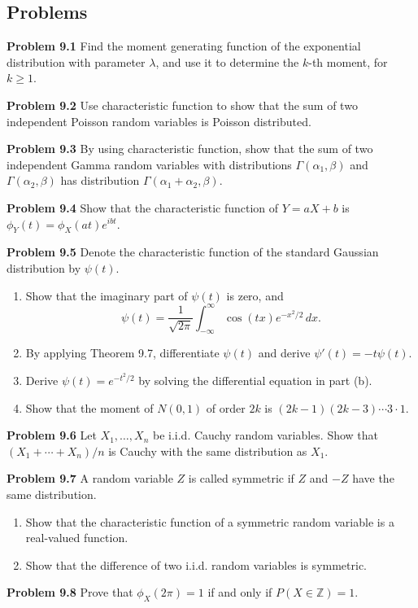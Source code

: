 \subsection*{Problems}

\textbf{Problem 9.1} Find the moment generating function of the exponential distribution with parameter $\lambda$, and use it to determine the $k$-th moment, for $k\geq 1$.

\textbf{Problem 9.2} Use characteristic function to show that the sum of two independent Poisson random variables is Poisson distributed.

\textbf{Problem 9.3} By using characteristic function, show that the sum of two independent Gamma random variables with distributions $\Gamma(\alpha_1,\beta)$ and $\Gamma(\alpha_2,\beta)$ has distribution $\Gamma(\alpha_1+\alpha_2,\beta)$.

\textbf{Problem 9.4} Show that the characteristic function of $Y=aX+b$ is $\phi_Y(t)=\phi_X(at)e^{ibt}$.

\textbf{Problem 9.5} Denote the characteristic function of the standard Gaussian distribution by $\psi(t)$.
\begin{enumerate}
\item Show that the imaginary part of $\psi(t)$ is zero, and
\[
\psi(t)=\frac{1}{\sqrt{2\pi}}\int_{-\infty}^{\infty}\cos(tx)e^{-x^2/2}\,dx.
\]
\item By applying Theorem 9.7, differentiate $\psi(t)$ and derive $\psi'(t)=-t\psi(t)$.
\item Derive $\psi(t)=e^{-t^2/2}$ by solving the differential equation in part (b).
\item Show that the moment of $N(0,1)$ of order $2k$ is $(2k-1)(2k-3)\cdots 3\cdot 1$.
\end{enumerate}

\textbf{Problem 9.6} Let $X_1,\ldots,X_n$ be i.i.d. Cauchy random variables. Show that $(X_1+\cdots+X_n)/n$ is Cauchy with the same distribution as $X_1$.

\textbf{Problem 9.7} A random variable $Z$ is called symmetric if $Z$ and $-Z$ have the same distribution.
\begin{enumerate}
\item Show that the characteristic function of a symmetric random variable is a real-valued function.
\item Show that the difference of two i.i.d. random variables is symmetric.
\end{enumerate}

\textbf{Problem 9.8} Prove that $\phi_X(2\pi)=1$ if and only if $P(X\in\mathbb{Z})=1$.

